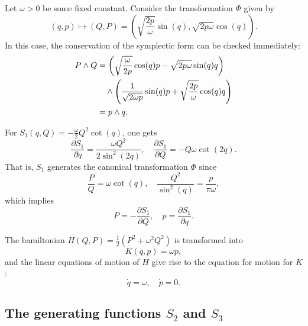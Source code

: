 \documentclass[english,fontsize=11pt,paper=a5,oneside]{scrbook}
\let\d\relax
\newcommand{\d}{\mathrm{d}}
\theoremstyle{definition}
\newenvironment{example}
  {\pushQED{\qed}\renewcommand{\qedsymbol}{$\lozenge$}\examplex}
  {\popQED\endexamplex}
\begin{document}
\begin{example}\label{ex:integrabilityho}
  Let $\omega > 0$ be some fixed constant.
  Consider the transformation $\Phi$ given by
  \begin{equation}
    (q,p) \mapsto (Q,P) = \left(
    \sqrt{\frac{2p}{\omega}} \sin(q),
    \sqrt{2p\omega}\cos(q)
    \right).
  \end{equation}
  In this case, the conservation of the symplectic form can be checked immediately:
  \begin{align}
    \d P\wedge \d Q & =
    \left(\sqrt{\frac{\omega}{2 p}}\cos(q)\d p - \sqrt{2 p\omega} \sin(q)\d q\right)           \\
                    & \quad\wedge
    \left(\frac{1}{\sqrt{2\omega p}}\sin(q)\d p + \sqrt{\frac{2 p}{\omega}} \cos(q)\d q\right) \\
                    & = \d p \wedge \d q.
  \end{align}

  For $S_1(q,Q) = -\frac{\omega}{2}Q^2\cot(q)$, one gets
  \begin{equation}
    \frac{\partial S_1}{\partial q} = \frac{\omega Q^2}{2\sin^2(2q)}, \quad
    \frac{\partial S_1}{\partial Q} = - Q\omega \cot(2q).
  \end{equation}
  That is, $S_1$ generates the canonical transformation $\Phi$ since
  \begin{equation}
    \frac{P}{Q} = \omega\cot(q), \quad
    \frac{Q^2}{\sin^2(q)} = \frac{p}{\pi\omega},
  \end{equation}
  which implies
  \begin{equation}
    P = -\frac{\partial S_1}{\partial Q}, \quad
    p = \frac{\partial S_1}{\partial q}.
  \end{equation}

  The hamiltonian $H(Q,P) = \frac12 (P^2 + \omega^2 Q^2)$ is transformed into
  \begin{equation}
    K(q,p) = \omega p,
  \end{equation}
  and the linear equations of motion of $H$ give rise to the equation for motion for $K$:
  \begin{equation}
    \dot q = \omega, \quad \dot p = 0.
  \end{equation}
\end{example}

\subsection{The generating functions $S_2$ and $S_3$}
\end{document}
